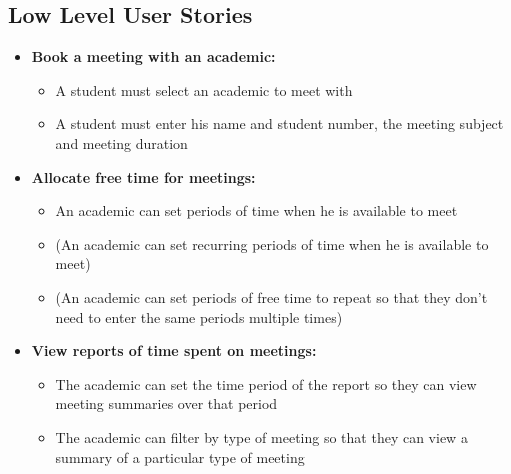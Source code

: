 \documentclass[11pt, a4paper]{article}
\begin{document}
	\subsection{Low Level User Stories}
	\begin{itemize}
		\item \textbf{Book a meeting with an academic: }
		\begin{itemize}
			\item A student must select an academic to meet with
			\item A student must enter his name and student number, the meeting subject and meeting duration
		\end{itemize}
		\item \textbf{Allocate free time for meetings: }
		\begin{itemize}
			\item An academic can set periods of time when he is available to meet
			\item (An academic can set recurring periods of time when he is available to meet)
			\item (An academic can set periods of free time to repeat so that they don't need to enter the same periods multiple times)
		\end{itemize}
		\item \textbf{View reports of time spent on meetings: }
		\begin{itemize}
			\item The academic can set the time period of the report so they can view meeting summaries over that period
			\item The academic can filter by type of meeting so that they can view a summary of a particular type of meeting
		\end{itemize}
	\end{itemize}
	
\end{document}

